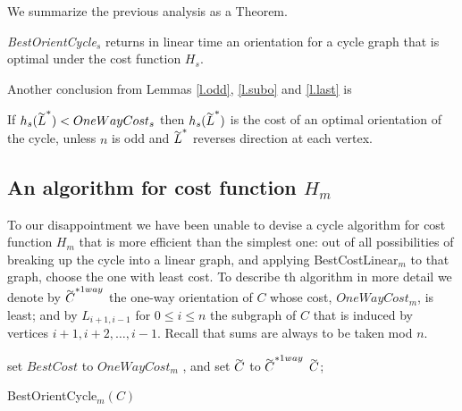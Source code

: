 We summarize the previous analysis as a Theorem.
\begin{theorem}\label{t.cycle-s}
	\emph{BestOrientCycle}$_s$  returns  in linear time an orientation for a cycle graph that is optimal under the cost function $H_s$.
\end{theorem}

Another conclusion from Lemmas \ref{l.odd}, \ref{l.subo} and \ref{l.last} is
\begin{corollary}
	If $h_s(\tildeb{L}^*) < OneWayCost_s$ then $h_s(\tildeb{L}^*)$ is the cost of an optimal orientation of the cycle, unless $n$ is odd and $\tildeb{L}^*$ reverses direction at each vertex.
\end{corollary}

\subsection{An algorithm for cost function $H_m$}\label{s.cm}

To our disappointment we have been unable to devise a cycle algorithm for cost function $H_m$ that 
is more efficient than the simplest one: 
out of all possibilities of breaking up the cycle into a linear graph, and applying 
BestCostLinear$_m$ to that graph, choose the one with least cost. 
To describe th algorithm in more detail 
we denote by $\tildeb{C}^{*1way}$ the one-way orientation of $C$
whose cost, ${OneWayCost_m}$, is least; and by $L_{i+1,i-1}$ for $0\leq i \leq n$ 
the subgraph of $C$
that is induced by vertices $i+1,i+2,\ldots, i-1$. Recall that sums are 
always to be taken mod $n$.
\begin{algorithm}
set $BestCost$ to $OneWayCost_m$
, and set $ \tildeb{C}$ to $\tildeb{C}^{*1way}$
\;
	\label{ac.i1} 
	\Return $\tildeb{C}$; 
	\caption{BestOrientCycle$_m(C)$}
	\label{algo:oc-m}
\end{algorithm}

